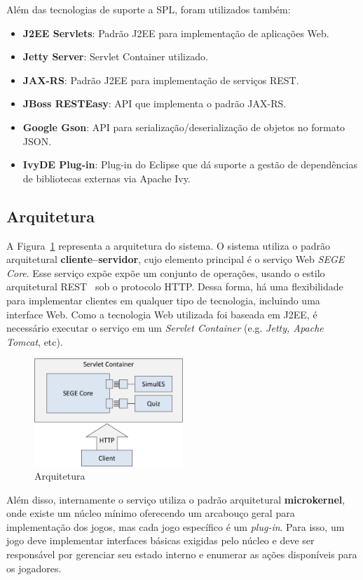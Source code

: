 \documentclass[12pt]{article}
\begin{document}
Além das tecnologias de suporte a SPL, foram utilizados também:
\begin{itemize}
\item \textbf{J2EE Servlets}: Padrão J2EE para implementação de aplicações Web.
\item \textbf{Jetty Server}: Servlet Container utilizado.
\item \textbf{JAX-RS}: Padrão J2EE para implementação de serviços REST.
\item \textbf{JBoss RESTEasy}: API que implementa o padrão JAX-RS.
\item \textbf{Google Gson}: API para serialização/deserialização de objetos no formato JSON.
\item \textbf{IvyDE Plug-in}: Plug-in do Eclipse que dá suporte a gestão de dependências de bibliotecas externas via Apache Ivy.
\end{itemize}

\subsection{Arquitetura}

A Figura~\ref{img:architecture} representa a arquitetura do sistema. O sistema utiliza o padrão arquitetural \textbf{cliente--servidor}, cujo elemento principal é o serviço Web \emph{SEGE Core}. Esse serviço expõe expõe um conjunto de operações, usando o estilo arquitetural REST~\cite{fielding2000rest} sob o protocolo HTTP. Dessa forma, há uma flexibilidade para implementar clientes em qualquer tipo de tecnologia, incluindo uma interface Web. Como a tecnologia Web utilizada foi baseada em J2EE, é necessário executar o serviço em um \emph{Servlet Container} (e.g. \emph{Jetty, Apache Tomcat}, etc).

\begin{figure}[htb]
\centering
\includegraphics[width=0.5\textwidth]{img/architecture.pdf}
\caption{Arquitetura}
\label{img:architecture}
\end{figure}

Além disso, internamente o serviço utiliza o padrão arquitetural \textbf{microkernel}, onde existe um núcleo mínimo oferecendo um arcabouço geral para implementação dos jogos, mas cada jogo específico é um \emph{plug-in}. Para isso, um jogo deve implementar interfaces básicas exigidas pelo núcleo e deve ser responsável por gerenciar seu estado interno e enumerar as ações disponíveis para os jogadores.
\end{document}
